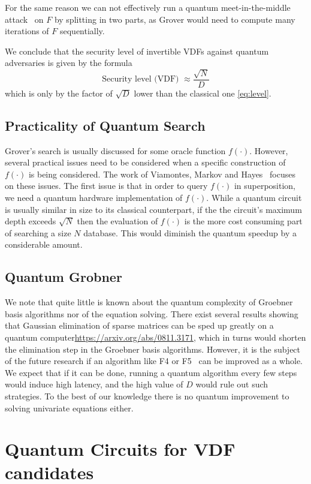 For the same reason we can not effectively run a quantum meet-in-the-middle attack~\cite{DBLP:journals/sigact/BrassardHT97} on $F$ by splitting in two parts, as Grover would need to compute many iterations of $F$ sequentially.

We conclude that the security level of invertible VDFs against quantum adversaries is given by the formula
 \begin{equation}\label{eq:level2}
     \text{Security level (VDF) }\approx {\frac{\sqrt{N}}{D}} \end{equation}
which is only by the factor of $\sqrt{D}$ lower than the classical one \eqref{eq:level}.


\subsection{Practicality of Quantum Search}

Grover's search is usually discussed for some oracle function $f(\cdot)$. However, several practical issues need to be considered when a specific construction of $f(\cdot)$ is being considered. The work of Viamontes, Markov and Hayes~\cite{practicalityGrover05} focuses on these issues.  The first issue is that in order to query $f(\cdot)$ in superposition, we need a quantum hardware implementation of  $f(\cdot)$. While a quantum circuit is usually similar in size to its classical counterpart, if the the circuit's maximum depth exceeds $\sqrt{N}$ then the evaluation of  $f(\cdot)$ is the more cost consuming part of searching a size $N$ database. This would diminish the quantum speedup by a considerable amount.


\subsection{Quantum Grobner}

We note that quite little is known about the quantum complexity of Groebner basis algorithms nor of the equation solving. There exist several results showing that Gaussian elimination of sparse matrices can be sped up greatly on a quantum computer\url{https://arxiv.org/abs/0811.3171}, which in turns would shorten the elimination step in the Groebner basis algorithms. However, it is the subject of the future research if an algorithm like F4 or F5~\cite{faugere2002new} can be improved as a whole. We expect that if it can be done, running a quantum algorithm every few steps would induce high latency, and the high value of $D$ would rule out such strategies. To the best of our knowledge there is no quantum improvement to solving univariate equations either.
 
\section{Quantum Circuits for VDF candidates}
 